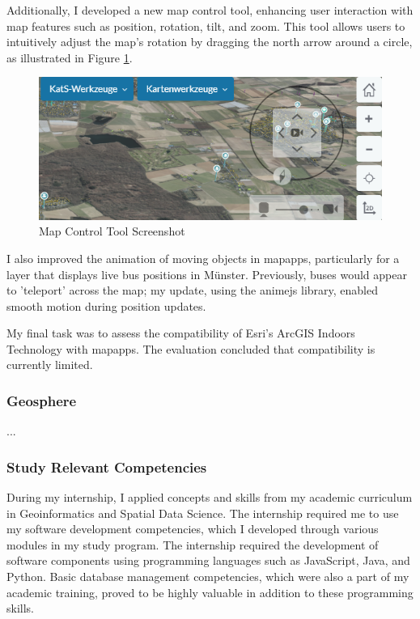\documentclass[11pt, titlepage, a4paper]{article}
\begin{document}
Additionally, I developed a new map control tool, enhancing user interaction with map features such as position, rotation, tilt, and zoom. This tool allows users to intuitively adjust the map's rotation by dragging the north arrow around a circle, as illustrated in Figure \ref{fig:mapcontrol}.

\begin{figure}[H]
    \caption{Map Control Tool Screenshot}
    \label{fig:mapcontrol}
    \includegraphics[width=16cm]{dzgefahr_mapcontrol.png}
    \centering
\end{figure}

I also improved the animation of moving objects in mapapps, particularly for a layer that displays live bus positions in Münster. Previously, buses would appear to 'teleport' across the map; my update, using the animejs library, enabled smooth motion during position updates.

My final task was to assess the compatibility of Esri's ArcGIS Indoors Technology with mapapps. The evaluation concluded that compatibility is currently limited.
\subsubsection{Geosphere}
...



\subsubsection{Study Relevant Competencies}
During my internship, I applied concepts and skills from my academic curriculum in Geoinformatics and Spatial Data Science. The internship required me to use my software development competencies, which I developed through various modules in my study program. The internship required the development of software components using programming languages such as JavaScript, Java, and Python. Basic database management competencies, which were also a part of my academic training, proved to be highly valuable in addition to these programming skills.
\end{document}
